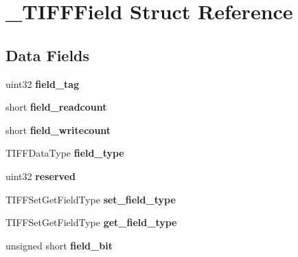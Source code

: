 \hypertarget{struct___t_i_f_f_field}{}\section{\+\_\+\+T\+I\+F\+F\+Field Struct Reference}
\label{struct___t_i_f_f_field}
\subsection*{Data Fields}
\begin{DoxyCompactItemize}
\item 
\hypertarget{struct___t_i_f_f_field_aa999ba2e7c878be00b22c8080cd7b771}{}uint32 {\bfseries field\+\_\+tag}\label{struct___t_i_f_f_field_aa999ba2e7c878be00b22c8080cd7b771}

\item 
\hypertarget{struct___t_i_f_f_field_ac70a09d7c8145dc250f1a248c3f2c076}{}short {\bfseries field\+\_\+readcount}\label{struct___t_i_f_f_field_ac70a09d7c8145dc250f1a248c3f2c076}

\item 
\hypertarget{struct___t_i_f_f_field_acce9397b4e3202936f173de755016a67}{}short {\bfseries field\+\_\+writecount}\label{struct___t_i_f_f_field_acce9397b4e3202936f173de755016a67}

\item 
\hypertarget{struct___t_i_f_f_field_adcbe4fb42526544f194fdbdafc5bd07c}{}T\+I\+F\+F\+Data\+Type {\bfseries field\+\_\+type}\label{struct___t_i_f_f_field_adcbe4fb42526544f194fdbdafc5bd07c}

\item 
\hypertarget{struct___t_i_f_f_field_ab3fd3e5f7bb36e0b63ec3576b73b18cb}{}uint32 {\bfseries reserved}\label{struct___t_i_f_f_field_ab3fd3e5f7bb36e0b63ec3576b73b18cb}

\item 
\hypertarget{struct___t_i_f_f_field_acea5cf9567f3d88b10baf7c47d0f8fcf}{}T\+I\+F\+F\+Set\+Get\+Field\+Type {\bfseries set\+\_\+field\+\_\+type}\label{struct___t_i_f_f_field_acea5cf9567f3d88b10baf7c47d0f8fcf}

\item 
\hypertarget{struct___t_i_f_f_field_aaaf1786e3e3503f52978c5dc97dba700}{}T\+I\+F\+F\+Set\+Get\+Field\+Type {\bfseries get\+\_\+field\+\_\+type}\label{struct___t_i_f_f_field_aaaf1786e3e3503f52978c5dc97dba700}

\item 
\hypertarget{struct___t_i_f_f_field_aa9de1aeb999a82556bf96d28dd49b2a6}{}unsigned short {\bfseries field\+\_\+bit}\label{struct___t_i_f_f_field_aa9de1aeb999a82556bf96d28dd49b2a6}


\end{DoxyCompactItemize}
